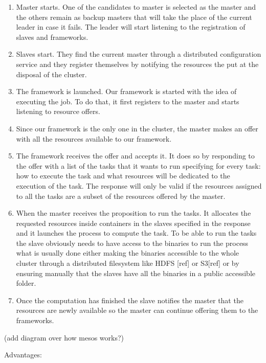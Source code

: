 \documentclass{svjour3}                     %
\begin{document}
\begin{enumerate}
\item Master starts. One of the candidates to master is selected as the master and 
the others remain as backup masters that will take the place of the current leader in
case it fails. The leader will start listening to the registration of slaves and 
frameworks.
\item Slaves start. They find the current master through a distributed configuration 
service and they register themselves by notifying the resources the put at the disposal
of the cluster.
\item The framework is launched. Our framework is started with the idea of executing 
the job. To do that, it first registers to the master and starts listening to resource
offers.
\item Since our framework is the only one in the cluster, the master makes an offer with
all the resources available to our framework.
\item The framework receives the offer and accepts it. It does so by responding to the
offer with a list of the tasks that it wants to run specifying for every task: how to 
execute the task and what resources will be dedicated to the execution of the task.
The response will only be valid if the resources assigned to all the tasks are a subset
of the resources offered by the master.
\item When the master receives the proposition to run the tasks. It allocates the requested
resources inside containers in the slaves specified in the response and it launches the
process to compute the task. To be able to run the tasks the slave obviously needs to 
have access to the binaries to run the process what is usually done either making the
binaries accessible to the whole cluster through a distributed filesystem like HDFS [ref]
or S3[ref] or by ensuring manually that the slaves have all the binaries in a public
accessible folder.
\item Once the computation has finished the slave notifies the master that the resources
are newly available so the master can continue offering them to the frameworks.
\end{enumerate}


(add diagram over how mesos works?)

Advantages:
\end{document}

